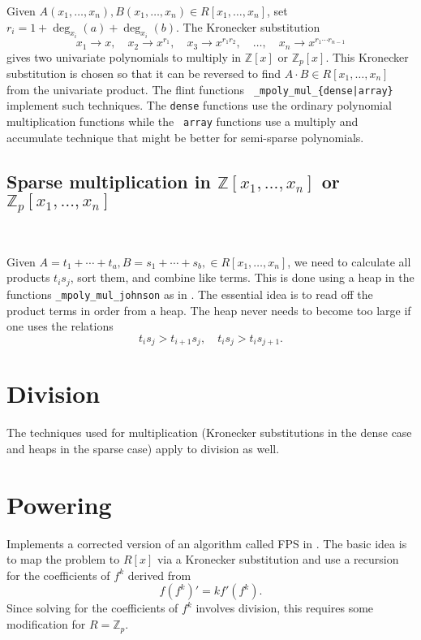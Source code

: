 \documentclass[11pt,reqno]{amsart}
\numberwithin{equation}{section}
\newcommand{\op}[1]  { \operatorname{ #1 }}
\newcommand{\bbZ}[0]  { \mathbb{Z}}
\begin{document}
Given $A(x_1,\dots,x_n), B(x_1,\dots,x_n) \in R[x_1,\dots,x_n]$, set $r_i = 1 +
\op{deg}_{x_i}(a) + \op{deg}_{x_i}(b)$. The Kronecker substitution
\begin{equation*}
x_1 \to x, \quad x_2 \to x^{r_1}, \quad x_3 \to x^{r_1 r_2}, \quad \dots, \quad
x_n \to x^{r_1 \cdots r_{n-1}}
\end{equation*}
gives two univariate polynomials to multiply in $\bbZ[x]$ or $\bbZ_p[x]$. This
Kronecker substitution is chosen so that it can be reversed to find $A \cdot B
\in R[x_1,\dots,x_n]$ from the univariate product. The flint functions {\tt
\_mpoly\_mul\_\{dense|array\}} implement such techniques. The {\tt dense}
functions use the ordinary polynomial multiplication functions while the {\tt
array} functions use a multiply and accumulate technique that might be better
for semi-sparse polynomials.

\subsection{Sparse multiplication in $\bbZ[x_1,\dots,x_n]$ or
$\bbZ_p[x_1,\dots,x_n]$}\

Given $A = t_1 + \cdots + t_a, B = s_1 + \cdots + s_b, \in R[x_1,\dots,x_n]$,
we need to calculate all products $t_i s_j$, sort them, and combine like terms.
This is done using a heap in the functions {\tt \_mpoly\_mul\_johnson} as in
\cite{Johnson}. The essential idea is to read off the product terms in order
from a heap. The heap never needs to become too large if one uses the relations
\begin{equation*}
t_i s_j > t_{i+1} s_j, \quad t_i s_j > t_i s_{j+1}\text{.}
\end{equation*}


\section{Division}

The techniques used for multiplication (Kronecker substitutions in the dense
case and heaps in the sparse case) apply to division as well.


\section{Powering}

Implements a corrected version of an algorithm called FPS in \cite{FPS}. The
basic idea is to map the problem to $R[x]$ via a Kronecker substitution and use
a recursion for the coefficients of $f^k$ derived from
\begin{equation*}
f (f^k)' = k f' (f^k)\text{.}
\end{equation*}
Since solving for the coefficients of $f^k$ involves division, this requires
some modification for $R=\bbZ_p$.
\end{document}
